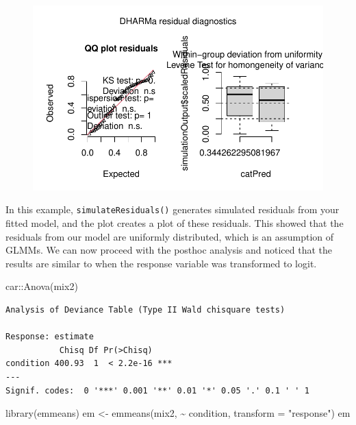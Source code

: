 \documentclass[
  letterpaper,
  DIV=11,
  numbers=noendperiod]{scrreprt}
\newenvironment{Shaded}{\begin{snugshade}}{\end{snugshade}}
\newcommand{\AttributeTok}[1]{\textcolor[rgb]{0.40,0.45,0.13}{#1}}
\newcommand{\FunctionTok}[1]{\textcolor[rgb]{0.28,0.35,0.67}{#1}}
\newcommand{\NormalTok}[1]{\textcolor[rgb]{0.00,0.23,0.31}{#1}}
\newcommand{\OtherTok}[1]{\textcolor[rgb]{0.00,0.23,0.31}{#1}}
\newcommand{\SpecialCharTok}[1]{\textcolor[rgb]{0.37,0.37,0.37}{#1}}
\newcommand{\StringTok}[1]{\textcolor[rgb]{0.13,0.47,0.30}{#1}}
\begin{document}
\begin{figure}[H]

{\centering \includegraphics{data-sads_files/figure-pdf/unnamed-chunk-12-1.pdf}

}

\end{figure}

In this example, \texttt{simulateResiduals()} generates simulated
residuals from your fitted model, and the plot creates a plot of these
residuals. This showed that the residuals from our model are uniformly
distributed, which is an assumption of GLMMs. We can now proceed with
the posthoc analysis and noticed that the results are similar to when
the response variable was transformed to logit.

\begin{Shaded}
\begin{Highlighting}[]
\NormalTok{car}\SpecialCharTok{::}\FunctionTok{Anova}\NormalTok{(mix2)}
\end{Highlighting}
\end{Shaded}

\begin{verbatim}
Analysis of Deviance Table (Type II Wald chisquare tests)

Response: estimate
           Chisq Df Pr(>Chisq)    
condition 400.93  1  < 2.2e-16 ***
---
Signif. codes:  0 '***' 0.001 '**' 0.01 '*' 0.05 '.' 0.1 ' ' 1
\end{verbatim}

\begin{Shaded}
\begin{Highlighting}[]
\FunctionTok{library}\NormalTok{(emmeans)}
\NormalTok{em }\OtherTok{\textless{}{-}} \FunctionTok{emmeans}\NormalTok{(mix2, }\SpecialCharTok{\textasciitilde{}}\NormalTok{ condition, }\AttributeTok{transform =} \StringTok{"response"}\NormalTok{)}
\NormalTok{em}
\end{Highlighting}
\end{Shaded}
\end{document}
